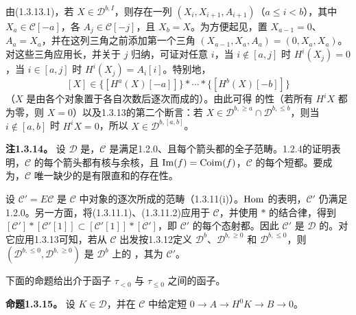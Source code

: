 由(1.3.13.1)，若 $X\in\mathcal D^{b,I}$，则存在一列 $(X_i,X_{i+1},A_{i+1})$（$a\leq i<b$），其中 $X_a\in\mathcal C[-a]$，各 $A_j\in\mathcal C[-j]$，且 $X_b=X$。为方便起见，置 $X_{a-1}=0$、$A_a=X_a$，并在这列三角之前添加第一个三角
$(X_{a-1},X_a,A_a)=(0,X_a,X_a)$。对这些三角应用长，并关于 $j$ 归纳，可证对任意 $i$，当 $i\notin[a,j]$ 时 $H^i(X_j)=0$，当 $i\in[a,j]$ 时 $H^i(X_j)=A_i[i]$。特别地，
\[
 [X]\in\{[H^a(X)[-a]]\}*\cdots*\{[H^b(X)[-b]]\}
\]
（$X$ 是由各个对象置于各自次数后逐次而成的）。由此可得 的性（若所有 $H^iX$ 都为零，则 $X=0$）以及1.3.13的第二个断言：若 $X\in\mathcal D^{b,\geq a}\cap\mathcal D^{b,\leq b}$，则当 $i\notin[a,b]$ 时 $H^iX=0$，所以 $X\in\mathcal D^{b,[a,b]}$。

\par\medskip\noindent\textbf{注1.3.14。} 设 $\mathcal D$ 是，$\mathcal C$ 是满足1.2.0、且每个箭头都的全子范畴。1.2.4的证明表明，$\mathcal C$ 的每个箭头都有核与余核，且 $\operatorname{Im}(f)=\mathrm{Coim}(f)$，$\mathcal C$ 的每个短都。要成为，$\mathcal C$ 唯一缺少的是有限直和的存在性。

设 $\mathcal C'=E\mathcal C$ 是 $\mathcal C$ 中对象的逐次所成的范畴（1.3.11(i)）。$\operatorname{Hom}$ 的表明，$\mathcal C'$ 仍满足1.2.0。另一方面，将(1.3.11.1)、(1.3.11.2)应用于 $\mathcal C$，并使用 $*$ 的结合律，得到 $[\mathcal C']*[\mathcal C'[1]]\subset[\mathcal C'[1]]*[\mathcal C']$，即 $\mathcal C'$ 的每个态射都。因此 $\mathcal C'$ 是 $\mathcal D$ 的。对它应用1.3.13可知，若从 $\mathcal C$ 出发按1.3.12定义 $\mathcal D^b$、$\mathcal D^{b,\geq0}$ 和 $\mathcal D^{b,\leq0}$，则 $(\mathcal D^{b,\leq0},\mathcal D^{b,\geq0})$ 是 $\mathcal D^b$ 上的 ，其为 $\mathcal C'$。

下面的命题给出介于函子 $\tau_{<0}$ 与 $\tau_{\leq0}$ 之间的函子。

\par\medskip\noindent\textbf{命题1.3.15。} 设 $K\in\mathcal D$，并在 $\mathcal C$ 中给定短 $0\to A\to H^0K\to B\to0$。

